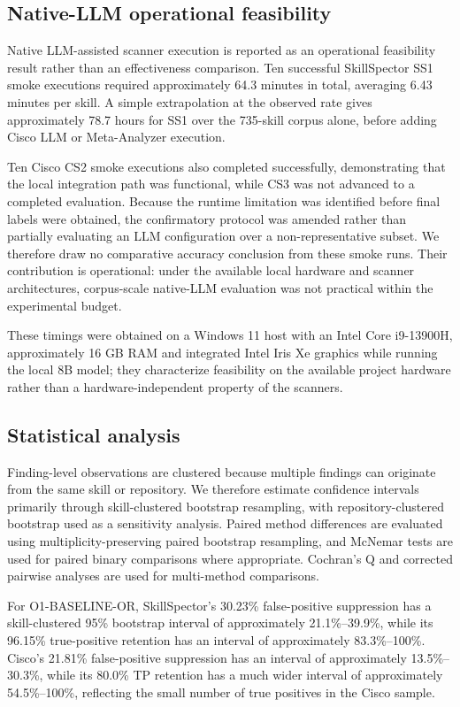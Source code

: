 \documentclass[conference]{IEEEtran}
\begin{document}
\subsection{Native-LLM operational feasibility}

Native LLM-assisted scanner execution is reported as an operational feasibility result rather than an effectiveness comparison. Ten successful SkillSpector SS1 smoke executions required approximately 64.3 minutes in total, averaging 6.43 minutes per skill. A simple extrapolation at the observed rate gives approximately 78.7 hours for SS1 over the 735-skill corpus alone, before adding Cisco LLM or Meta-Analyzer execution.

Ten Cisco CS2 smoke executions also completed successfully, demonstrating that the local integration path was functional, while CS3 was not advanced to a completed evaluation. Because the runtime limitation was identified before final labels were obtained, the confirmatory protocol was amended rather than partially evaluating an LLM configuration over a non-representative subset. We therefore draw no comparative accuracy conclusion from these smoke runs. Their contribution is operational: under the available local hardware and scanner architectures, corpus-scale native-LLM evaluation was not practical within the experimental budget.

These timings were obtained on a Windows 11 host with an Intel Core i9-13900H, approximately 16 GB RAM and integrated Intel Iris Xe graphics while running the local 8B model; they characterize feasibility on the available project hardware rather than a hardware-independent property of the scanners.

\subsection{Statistical analysis}

Finding-level observations are clustered because multiple findings can originate from the same skill or repository. We therefore estimate confidence intervals primarily through skill-clustered bootstrap resampling, with repository-clustered bootstrap used as a sensitivity analysis. Paired method differences are evaluated using multiplicity-preserving paired bootstrap resampling, and McNemar tests are used for paired binary comparisons where appropriate. Cochran's Q and corrected pairwise analyses are used for multi-method comparisons.

For O1-BASELINE-OR, SkillSpector's 30.23\% false-positive suppression has a skill-clustered 95\% bootstrap interval of approximately 21.1\%--39.9\%, while its 96.15\% true-positive retention has an interval of approximately 83.3\%--100\%. Cisco's 21.81\% false-positive suppression has an interval of approximately 13.5\%--30.3\%, while its 80.0\% TP retention has a much wider interval of approximately 54.5\%--100\%, reflecting the small number of true positives in the Cisco sample.
\end{document}
